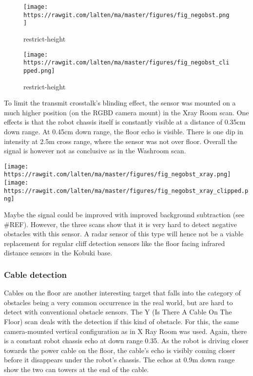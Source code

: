\begin{figure}
\centering
\texttt{[image: https://rawgit.com/lalten/ma/master/figures/fig\_negobst.png]}
\caption{restrict-height}
\end{figure}

\begin{figure}
\centering
\texttt{[image: https://rawgit.com/lalten/ma/master/figures/fig\_negobst\_clipped.png]}
\caption{restrict-height}
\end{figure}

To limit the transmit crosstalk's blinding effect, the sensor was
mounted on a much higher position (on the RGBD camera mount) in the Xray
Room scan. One effects is that the robot chassis itself is constantly
visible at a distance of 0.35cm down range. At 0.45cm down range, the
floor echo is visible. There is one dip in intensity at 2.5m cross
range, where the sensor was not over floor. Overall the signal is
however not as conclusive as in the Washroom scan.

\texttt{[image: https://rawgit.com/lalten/ma/master/figures/fig\_negobst\_xray.png]}
\texttt{[image: https://rawgit.com/lalten/ma/master/figures/fig\_negobst\_xray\_clipped.png]}

Maybe the signal could be improved with improved background subtraction
(see \#REF). However, the three scans show that it is very hard to
detect negative obstacles with this sensor. A radar sensor of this type
will hence not be a viable replacement for regular cliff detection
sensors like the floor facing infrared distance sensors in the Kobuki
base.

\subsubsection{Cable detection}\label{cable-detection}

Cables on the floor are another interesting target that falls into the
category of obstacles being a very common occurrence in the real world,
but are hard to detect with conventional obstacle sensors. The Y (Is
There A Cable On The Floor) scan deals with the detection if this kind
of obstacle. For this, the same camera-mounted vertical configuration as
in X Ray Room was used. Again, there is a constant robot chassis echo at
down range 0.35. As the robot is driving closer towards the power cable
on the floor, the cable's echo is visibly coming closer before it
disappears under the robot's chassis. The echos at 0.9m down range show
the two can towers at the end of the cable.

